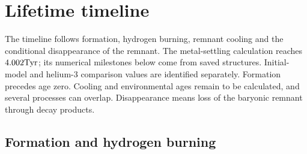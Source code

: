 \clearpage

\section{Lifetime timeline}
\label{sec:lifetime}
The timeline follows formation, hydrogen burning, remnant cooling and the
conditional disappearance of the remnant. The metal-settling calculation
reaches $4.002\mathrm{Tyr}$; its numerical milestones below come from saved
structures. Initial-model and helium-3 comparison values are identified
separately. Formation precedes age zero. Cooling and environmental ages
remain to be calculated, and several processes can overlap.
Disappearance means loss of the baryonic remnant through decay products.

\subsection{Formation and hydrogen burning}
